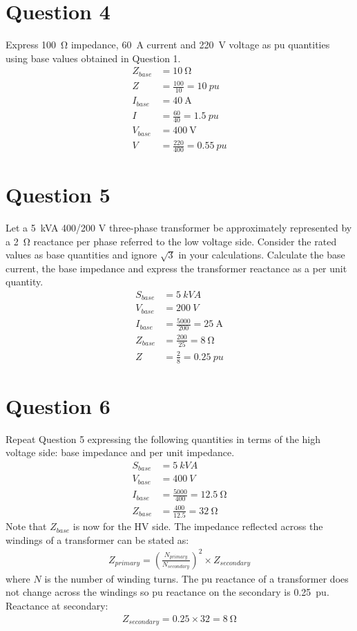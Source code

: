 \section{Question 4}
Express \SI{100}{\ohm} impedance, \SI{60}{\ampere} current and \SI{220}{\volt} voltage as pu quantities using base values obtained in Question 1.
\begin{align}
    Z_{base} &= \SI{10}{\ohm}\\
    Z &= \frac{100}{10} = \SI{10}{pu}\\
    I_{base} &= \SI{40}{\ampere}\\
    I &= \frac{60}{40} = \SI{1.5}{pu}\\
    V_{base} &= \SI{400}{\volt}\\
    V &= \frac{220}{400} = \SI{0.55}{pu}
\end{align}
\section{Question 5}
Let a \SI{5}{kVA} 400/200 V three-phase transformer be approximately represented by a \SI{2}{\ohm} reactance per phase referred to the low voltage side. Consider the rated values as base quantities and ignore $\sqrt{3}$ in your calculations. Calculate the base current, the base impedance and express the transformer reactance as a per unit quantity.
\begin{align}
    S_{base} &= \SI{5}{kVA}\\
    V_{base} &= \SI{200}{V}\\
    I_{base} &= \frac{5000}{200} = \SI{25}{\ampere}\\
    Z_{base} &= \frac{200}{25} = \SI{8}{\ohm}\\
    Z &= \frac{2}{8} = \SI{0.25}{pu}
\end{align}
\section{Question 6}
Repeat Question 5 expressing the following quantities in terms of the high voltage side: base impedance and per unit impedance.
\begin{align}
    S_{base} &= \SI{5}{kVA}\\
    V_{base} &= \SI{400}{V}\\
    I_{base} &= \frac{5000}{400} = \SI{12.5}{\ohm}\\
    Z_{base} &= \frac{400}{12.5} = \SI{32}{\ohm}
\end{align}
Note that $Z_{base}$ is now for the HV side. The impedance reflected across the windings of a transformer can be stated as:
\begin{gather}
    Z_{primary} = \left(\frac{N_{primary}}{N_{secondary}}\right)^2\times Z_{secondary}
\end{gather}
where $N$ is the number of winding turns. The pu reactance of a transformer does not change across the windings so pu reactance on the secondary is \SI{0.25}{pu}. Reactance at secondary:
\begin{gather}
    Z_{secondary} = 0.25 \times 32 = \SI{8}{\ohm}
\end{gather}
